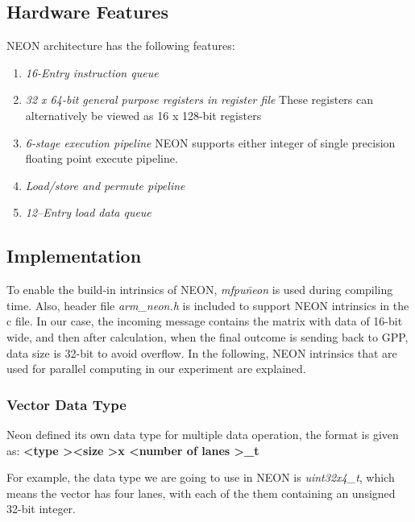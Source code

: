 \subsection{Hardware Features}
NEON architecture has the following features:
\begin{enumerate}
\item \emph{16-Entry instruction queue}
\item \emph{32 x 64-bit general purpose registers in register file}
These registers can alternatively be viewed as 16 x 128-bit registers
\item \emph{6-stage execution pipeline}
NEON supports either integer of single precision floating point execute pipeline.
\item \emph{Load/store and permute pipeline}
\item \emph{12–Entry load data queue}
\end{enumerate}

\subsection{Implementation}
To enable the build-in intrinsics of NEON, 
\emph{\-mfpu\=neon} is used during compiling time.
Also, header file \emph{arm\_neon.h} is included 
to support NEON intrinsics in the c file.
In our case, the incoming message contains the matrix with data of 16-bit wide, 
and then after calculation, when the final outcome is sending back to GPP, data size is 32-bit to avoid overflow.
In the following, NEON intrinsics that are used for parallel computing in our experiment are explained.
\subsubsection{Vector Data Type}
Neon defined its own data type for multiple data operation, the format is given as:
\textbf{ \textless type \textgreater \textless size \textgreater x \textless number of lanes \textgreater\_t}

For example, the data type we are going to use in NEON is \emph{uint32x4\_t}, 
which means the vector has four lanes, 
with each of the them containing an unsigned 32-bit integer. 
